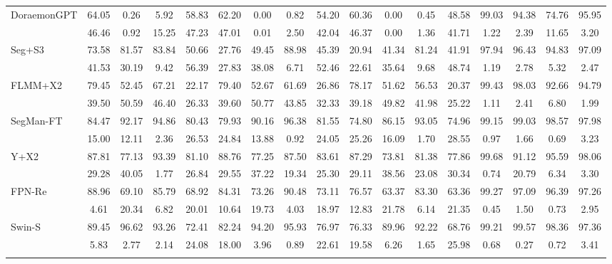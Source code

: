 \documentclass[preprint,12pt]{elsarticle}
\begin{document}
\begin{table}[!htbp]
\begin{tabular}{lcccccccccccccccc}
DoraemonGPT & 64.05 & 0.26 & 5.92 & 58.83 & 62.20 & 0.00 & 0.82 & 54.20 & 60.36 & 0.00 & 0.45 & 48.58 & 99.03 & 94.38 & 74.76 & 95.95 \\
  & 46.46 & 0.92 & 15.25 & 47.23 & 47.01 & 0.01 & 2.50 & 42.04 & 46.37 & 0.00 & 1.36 & 41.71 & 1.22 & 2.39 & 11.65 & 3.20 \\ \addlinespace[3pt]
\rowcolor{gray!12}
Seg+S3 & 73.58 & 81.57 & 83.84 & 50.66 & 27.76 & 49.45 & 88.98 & 45.39 & 20.94 & 41.34 & 81.24 & 41.91 & 97.94 & 96.43 & 94.83 & 97.09 \\
  & 41.53 & 30.19 & 9.42 & 56.39 & 27.83 & 38.08 & 6.71 & 52.46 & 22.61 & 35.64 & 9.68 & 48.74 & 1.19 & 2.78 & 5.32 & 2.47 \\ \addlinespace[3pt]
FLMM+X2 & 79.45 & 52.45 & 67.21 & 22.17 & 79.40 & 52.67 & 61.69 & 26.86 & 78.17 & 51.62 & 56.53 & 20.37 & 99.43 & 98.03 & 92.66 & 94.79 \\
  & 39.50 & 50.59 & 46.40 & 26.33 & 39.60 & 50.77 & 43.85 & 32.33 & 39.18 & 49.82 & 41.98 & 25.22 & 1.11 & 2.41 & 6.80 & 1.99 \\ \addlinespace[3pt]
\rowcolor{gray!12}
SegMan-FT & 84.47 & 92.17 & 94.86 & 80.43 & 79.93 & 90.16 & 96.38 & 81.55 & 74.80 & 86.15 & 93.05 & 74.96 & 99.15 & 99.03 & 98.57 & 97.98 \\
  & 15.00 & 12.11 & 2.36 & 26.53 & 24.84 & 13.88 & 0.92 & 24.05 & 25.26 & 16.09 & 1.70 & 28.55 & 0.97 & 1.66 & 0.69 & 3.23 \\ \addlinespace[3pt]
Y+X2 & 87.81 & 77.13 & 93.39 & 81.10 & 88.76 & 77.25 & 87.50 & 83.61 & 87.29 & 73.81 & 81.38 & 77.86 & 99.68 & 91.12 & 95.59 & 98.06 \\
  & 29.28 & 40.05 & 1.77 & 26.84 & 29.55 & 37.22 & 19.34 & 25.30 & 29.11 & 38.56 & 23.08 & 30.34 & 0.74 & 20.79 & 6.34 & 3.30 \\ \addlinespace[3pt]
\rowcolor{gray!12}
FPN-Re & 88.96 & 69.10 & 85.79 & 68.92 & 84.31 & 73.26 & 90.48 & 73.11 & 76.57 & 63.37 & 83.30 & 63.36 & 99.27 & 97.09 & 96.39 & 97.26 \\
  & 4.61 & 20.34 & 6.82 & 20.01 & 10.64 & 19.73 & 4.03 & 18.97 & 12.83 & 21.78 & 6.14 & 21.35 & 0.45 & 1.50 & 0.73 & 2.95 \\ \addlinespace[3pt]
Swin-S & 89.45 & 96.62 & 93.26 & 72.41 & 82.24 & 94.20 & 95.93 & 76.97 & 76.33 & 89.96 & 92.22 & 68.76 & 99.21 & 99.57 & 98.36 & 97.36 \\
  & 5.83 & 2.77 & 2.14 & 24.08 & 18.00 & 3.96 & 0.89 & 22.61 & 19.58 & 6.26 & 1.65 & 25.98 & 0.68 & 0.27 & 0.72 & 3.41 \\ \addlinespace[3pt]
\rowcolor{gray!12}

\end{tabular}
\end{table}
\end{document}
